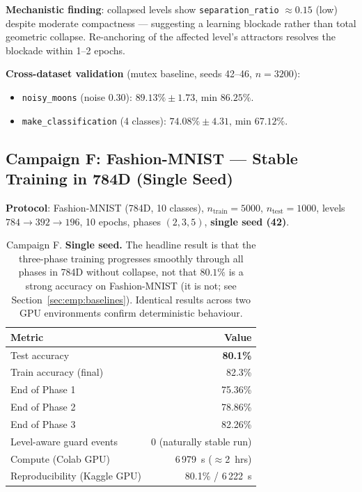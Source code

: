 \documentclass[11pt,a4paper]{article}
\begin{document}
\textbf{Mechanistic finding}: collapsed levels show \texttt{separation\_ratio} $\approx 0.15$
(low) despite moderate compactness --- suggesting a learning blockade rather than total
geometric collapse. Re-anchoring of the affected level's attractors resolves the blockade
within 1--2 epochs.

\textbf{Cross-dataset validation} (mutex baseline, seeds 42--46, $n=3200$):
\begin{itemize}
  \item \texttt{noisy\_moons} (noise 0.30): $89.13\% \pm 1.73$, min $86.25\%$.
  \item \texttt{make\_classification} (4 classes): $74.08\% \pm 4.31$, min $67.12\%$.
\end{itemize}

\subsection{Campaign F: Fashion-MNIST --- Stable Training in 784D (Single Seed)}

\textbf{Protocol}: Fashion-MNIST (784D, 10 classes), $n_{\mathrm{train}}=5000$,
$n_{\mathrm{test}}=1000$, levels $784 \to 392 \to 196$, 10 epochs, phases $(2,3,5)$,
\textbf{single seed (42)}.

\begin{table}[h]
\centering
\begin{tabular}{lr}
\toprule
\textbf{Metric} & \textbf{Value} \\
\midrule
Test accuracy                & \textbf{80.1\%} \\
Train accuracy (final)       & 82.3\% \\
End of Phase 1               & 75.36\% \\
End of Phase 2               & 78.86\% \\
End of Phase 3               & 82.26\% \\
Level-aware guard events     & 0 (naturally stable run) \\
Compute (Colab GPU)          & 6\,979~s ($\approx$2~hrs) \\
Reproducibility (Kaggle GPU) & 80.1\% / 6\,222~s \\
\bottomrule
\end{tabular}
\caption{Campaign F. \textbf{Single seed.} The headline result is that the
three-phase training progresses smoothly through all phases in 784D without collapse, not
that $80.1\%$ is a strong accuracy on Fashion-MNIST (it is not; see
Section~\ref{sec:emp:baselines}). Identical results across two GPU environments confirm
deterministic behaviour.}
\label{tab:campaign_f}
\end{table}
\end{document}
